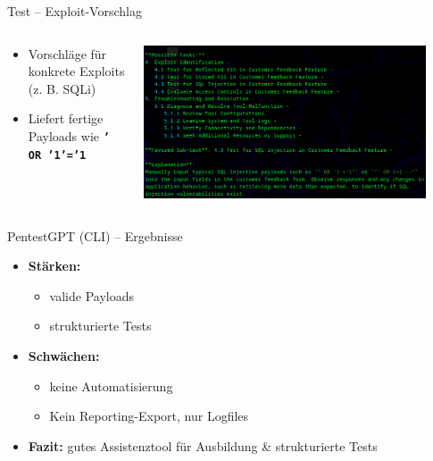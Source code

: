 \documentclass[
	aspectratio=169,	%
	onlytextwidth,		%
	t,					%
	]{beamer}
\begin{document}
\begin{frame}{Test – Exploit-Vorschlag}
	\begin{columns}
		\begin{column}[T]{.4\textwidth}
			\begin{itemize}
				\item Vorschläge für konkrete Exploits (z. B. SQLi)
				\item Liefert fertige Payloads wie \textbf{\texttt{' OR '1'='1}}
			\end{itemize}
		\end{column}
		\begin{column}[T]{.6\textwidth}
			\centering
			
			\includegraphics[width=0.9\textwidth]{figures/13.png}
			\label{fig:13}
		\end{column}
	\end{columns}
\end{frame}


\begin{frame}{PentestGPT (CLI) – Ergebnisse}
	\begin{itemize}
		\item \textbf{Stärken:}
		\begin{itemize}
			\item valide Payloads
			\item strukturierte Tests
		\end{itemize}
		
		\item \textbf{Schwächen:}
		\begin{itemize}
			\item keine Automatisierung
			\item Kein Reporting-Export, nur Logfiles
		\end{itemize}
		
		\item \textbf{Fazit:}  
		gutes Assistenztool für Ausbildung \& strukturierte Tests
	\end{itemize}
\end{frame}
\end{document}
